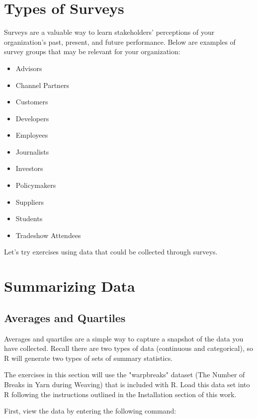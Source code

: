 %
%
%
%
%

\section{Types of Surveys}
Surveys are a valuable way to learn stakeholders' perceptions of your organization's past, present, and future performance. Below are examples of survey groups that may be relevant for your organization:

\begin{itemize}
 \item Advisors
 \item Channel Partners
 \item Customers
 \item Developers
 \item Employees
 \item Journalists
 \item Investors
 \item Policymakers
 \item Suppliers
 \item Students
 \item Tradeshow Attendees
\end{itemize}

Let's try exercises using data that could be collected through surveys.

\section{Summarizing Data}

\subsection{Averages and Quartiles}
Averages and quartiles are a simple way to capture a snapshot of the data you have collected. Recall there are two types of data (continuous and categorical), so R will generate two types of sets of summary statistics.

The exercises in this section will use the "warpbreaks" dataset (The Number of Breaks in Yarn during Weaving) that is included with R. Load this data set into R following the instructions outlined in the Installation section of this work.

First, view the data by entering the following command:

